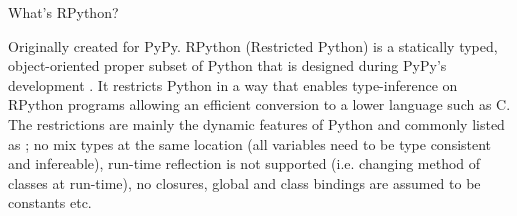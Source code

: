         \begin{paragraph-here}
            What's RPython?

            Originally created for PyPy.
            RPython (Restricted Python) is a statically typed, object-oriented
            proper subset of Python that is designed during PyPy's development
            \cite{pypy06}. It restricts Python in a way that enables
            type-inference on RPython programs allowing an efficient conversion to
            a lower language such as C. The restrictions are mainly the dynamic
            features of Python and commonly listed as \cite{rpython07,rpython09};
            no mix types at the same location (all variables need to be type
            consistent and infereable), run-time reflection is not supported
            (i.e. changing method of classes at run-time), no closures, global and
            class bindings are assumed to be constants etc.
        \end{paragraph-here}


